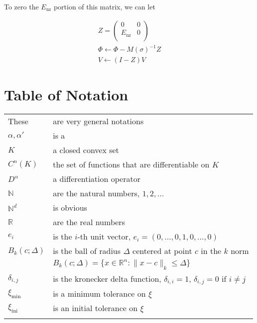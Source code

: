 \documentclass{article}
\theoremstyle{case}
\newcommand{\naturals}{\mathbb N}
\newcommand{\natsd}{\naturals^d}
\newcommand{\reals}{\mathbb R}
\newcommand{\ximin}{{\xi_{\textrm{min}}}}
\newcommand{\xiini}{{\xi_{\textrm{ini}}}}
\newcommand{\lunonzero}{{E_{\textrm{nz}}}}
\begin{document}
To zero the $\lunonzero$ portion of this matrix, we can let

\begin{align*}
Z = \begin{pmatrix}
0 & 0 \\
\lunonzero & 0 \\
\end{pmatrix} \\
\Phi \gets \Phi - M(\sigma)^{-1}Z \\
V \gets (I - Z) V
\end{align*}




\section{Table of Notation}
\begin{longtable}{| p{} | p{} |}
These & are very general notations \\   %
$\alpha, \alpha'$ & is a \\
$K$ & a closed convex set \\
$C^n(K)$ & the set of functions that are differentiable on $K$ \\
$D^{\alpha}$ & a differentiation operator \\
$ \naturals $ & are the natural numbers, $1, 2, \ldots$ \\
$ \natsd $ & is obvious \\
$ \reals $ & are the real numbers \\
$e_i$ & is the $i$-th unit vector, $e_i = (0, \ldots, 0, 1, 0, \ldots, 0)$ \\
$B_k(c; \Delta)$ & is the ball of radius $\Delta$ centered at point $c$ in the $k$ norm\\
& $B_k(c;\Delta) = \{ x \in \mathbb{R}^n : \| x - c\|_k \le \Delta \}$ \\
$\delta_{i,j}$ & is the kronecker delta function, $\delta_{i,i} = 1$, $\delta_{i,j} = 0$ if $i\ne j$ \\
$\ximin$ & is a minimum tolerance on $\xi$ \\
$\xiini$ & is an initial tolerance on $\xi$ \\
\label{tab:TableOfNotation}
\end{longtable}


\newpage




\end{document}
